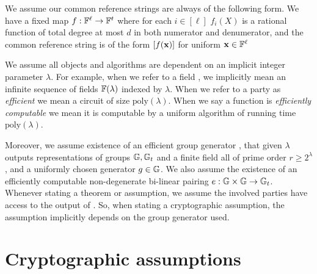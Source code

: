 \documentclass[11pt]{article}
\numberwithin{figure}{section} %
\newcommand{\x}{\ensuremath{\mathbf{x}}\xspace}
\newcommand{\poly}{\ensuremath{\mathrm{poly}(\lambda)}\xspace}
\begin{document}
We assume our common reference strings are always of the following form.
We have a fixed map $f:\mathbb F^{\ell} \to \mathbb F^t$ where for each $i\in [\ell]$ $f_i(X)$ is a rational function of total degree at most $d$ in both numerator and denumerator,
and the common reference string is of the form $\enc{f(\x)}$ for uniform $\x\in\F^\ell$

We assume all objects and algorithms are dependent on an implicit integer parameter $\lambda$.
For example, when we refer to a field \F, we implicitly mean an infinite sequence of fields $\mathbb F(\lambda)$ indexed by $\lambda$.
When we refer to a party \adv as \emph{efficient} we mean a circuit of size \poly.
When we say a function is \emph{efficiently computable} we mean it is computable by a uniform algorithm of running time \poly.

Moreover, we assume existence of an efficient group generator \groupgen, that given $\lambda$ outputs 
representations of groups ${\mathbb G},{\mathbb G}_t$ and a finite field \F all of prime order $r\geq 2^{\lambda}$,
and a uniformly chosen generator $g\in {\mathbb G}$.
We also assume the existence of an efficiently computable non-degenerate bi-linear pairing $e:{\mathbb G}\times{\mathbb G} \to {\mathbb G}_t$.
Whenever stating a theorem or assumption, we assume the involved parties have access to the output of \groupgen. So, when stating a cryptographic assumption, the assumption implicitly depends on the group generator used.


\section{Cryptographic assumptions}
\end{document}
